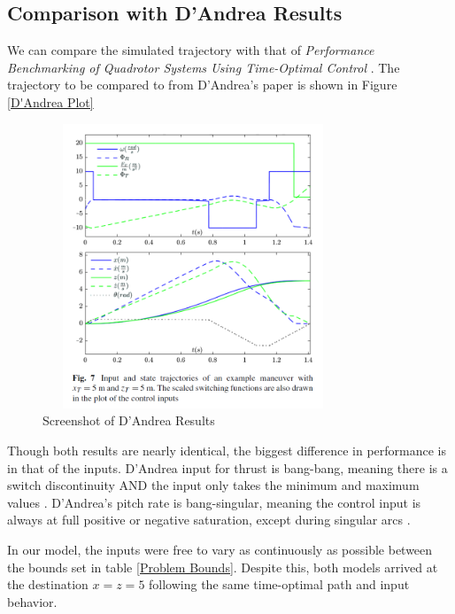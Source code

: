 \documentclass[12pt]{article}
\begin{document}
\subsection{Comparison with D'Andrea Results}

We can compare the simulated trajectory with that of \textit{Performance Benchmarking of Quadrotor Systems Using Time-Optimal Control} \cite{D'Andrea}. The trajectory to be compared to from D'Andrea's paper is shown in Figure \ref{D'Andrea Plot}


\begin{figure}[H]
\centerline{\includegraphics[width=9cm, height=8.5cm]{DAndrea_55_Plot.png}}
  \caption{\label{D'Andrea Plot} Screenshot of D'Andrea Results}
  \label{fig}
\end{figure}

Though both results are nearly identical, the biggest difference in performance is in that of the inputs. 
D'Andrea input for thrust is bang-bang, meaning there is a switch discontinuity AND the input only takes the minimum and maximum values \cite{BangBangControl}. D'Andrea's pitch rate is bang-singular, meaning the control input is always at full positive or negative saturation, except during singular arcs \cite{D'Andrea}.

In our model, the inputs were free to vary as continuously as possible between the bounds set in table \ref{Problem Bounds}. Despite this, both models arrived at the destination $x=z=5$ following the same time-optimal path and input behavior. 


\end{document}

